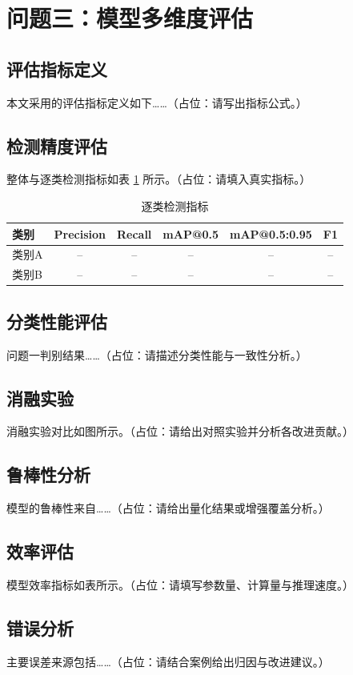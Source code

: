 \section{问题三：模型多维度评估}

\subsection{评估指标定义}
本文采用的评估指标定义如下……（占位：请写出指标公式。）

\subsection{检测精度评估}
整体与逐类检测指标如表 \ref{tab:per_class} 所示。（占位：请填入真实指标。）

\begin{table}[H]
\centering
{}
\caption{逐类检测指标}\label{tab:per_class}
\begin{tabular}{lccccc}
  \toprule
  类别 & Precision & Recall & mAP@0.5 & mAP@0.5:0.95 & F1 \\
  \midrule
  类别A & -- & -- & -- & -- & -- \\
  类别B & -- & -- & -- & -- & -- \\
  \bottomrule
\end{tabular}
\end{table}

\subsection{分类性能评估}
问题一判别结果……（占位：请描述分类性能与一致性分析。）

\subsection{消融实验}
消融实验对比如图所示。（占位：请给出对照实验并分析各改进贡献。）

\subsection{鲁棒性分析}
模型的鲁棒性来自……（占位：请给出量化结果或增强覆盖分析。）

\subsection{效率评估}
模型效率指标如表所示。（占位：请填写参数量、计算量与推理速度。）

\subsection{错误分析}
主要误差来源包括……（占位：请结合案例给出归因与改进建议。）
